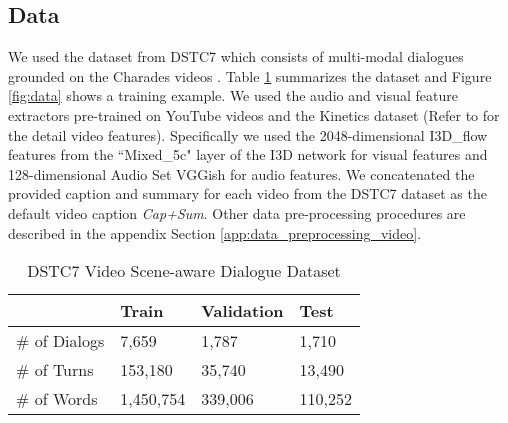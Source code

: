 \documentclass[11pt,a4paper]{article}
\begin{document}
\subsection{Data}
We used the dataset from DSTC7 \cite{DSTC7} which consists of multi-modal dialogues grounded on the Charades videos \cite{sigurdsson2016hollywood}. Table \ref{tab:datasets} summarizes the dataset and Figure \ref{fig:data} shows a training example.
We used the audio and visual feature extractors pre-trained on YouTube videos and the Kinetics dataset \cite{kay2017kinetics} (Refer to \cite{hori2018end} for the detail video features). Specifically we used the 2048-dimensional I3D\_flow features from the ``Mixed\_5c" layer of the I3D network \cite{carreira2017quo} for visual features and  128-dimensional Audio Set VGGish \cite{hershey2017cnn} for audio features. 
We concatenated the provided caption and summary for each video from the DSTC7 dataset as the default video caption \textit{Cap+Sum}. Other data pre-processing procedures are described in the appendix Section \ref{app:data_preprocessing_video}. 

\begin{table}[htbp]
	\centering
	\resizebox{1.0\columnwidth}{!} {
	\begin{tabular}{llll}
		\hline
		& \textbf{Train} & \textbf{Validation} & \textbf{Test}\\ \hline
		\# of Dialogs & 7,659                                 & 1,787                                   & 1,710	\\ \hline
		\# of Turns   & 153,180                               & 35,740                                  & 13,490   \\ \hline
		\# of Words   & 1,450,754                             & 339,006                                 & 110,252	\\ \hline
	\end{tabular}
	}
	\caption{DSTC7 Video Scene-aware Dialogue Dataset}
	\label{tab:datasets}
\end{table}
\end{document}
